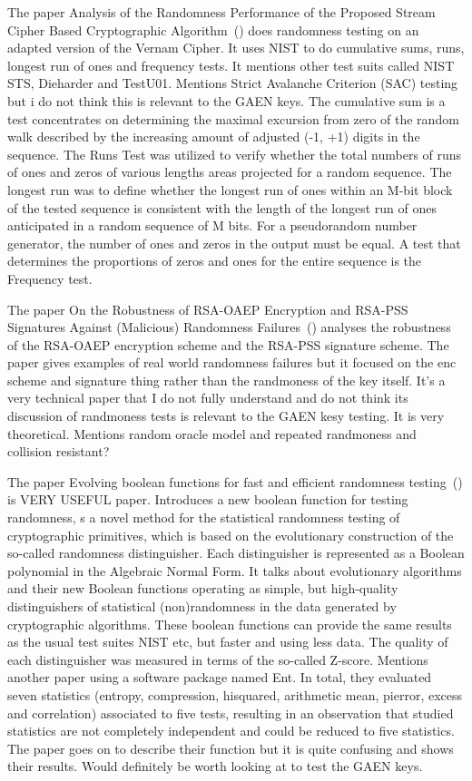 The paper Analysis of the Randomness Performance of the Proposed Stream Cipher Based Cryptographic Algorithm~(\cite{9232553}) does randomness testing on an adapted version of the Vernam Cipher. It uses NIST to do cumulative sums, runs, longest run of ones and frequency tests. It mentions other test suits called NIST STS, Dieharder and TestU01. Mentions Strict Avalanche Criterion (SAC) testing but i do not think this is relevant to the GAEN keys. The cumulative sum is a test concentrates on determining the maximal excursion from zero of the random walk described by the increasing amount of adjusted (-1, +1) digits in the sequence. The Runs Test was utilized to verify whether the total numbers of runs of ones and zeros of various lengths areas projected for a random sequence. The longest run was to define whether the longest run of ones within an M-bit block of the tested sequence is consistent with the length of the longest run of ones anticipated in a random sequence of M bits. For a pseudorandom number generator, the number of ones and zeros in the output must be equal. A test that determines the proportions of zeros and ones for the entire sequence is the Frequency test.

The paper On the Robustness of RSA-OAEP Encryption and RSA-PSS Signatures Against (Malicious) Randomness Failures~(\cite{10.1145/3052973.3053040}) analyses the robustness of the RSA-OAEP encryption scheme and the RSA-PSS signature scheme. The paper gives examples of real world randomness failures but it focused on the enc scheme and signature thing rather than the randmoness of the key itself. It's a very technical paper that I do not fully understand and do not think its discussion of randmoness tests is relevant to the GAEN kesy testing. It is very theoretical. Mentions random oracle model and repeated randmoness and collision resistant? 

The paper Evolving boolean functions for fast and efficient randomness testing~(\cite{10.1145/3205455.3205518}) is VERY USEFUL paper. Introduces a new boolean function for testing randomness, s a novel method for the statistical randomness testing of cryptographic primitives, which is based on the evolutionary construction of the so-called randomness distinguisher. Each distinguisher is represented as a Boolean polynomial in the Algebraic Normal Form. It talks about evolutionary algorithms and their new Boolean functions operating as simple, but high-quality distinguishers of statistical (non)randomness in the data generated by cryptographic algorithms. These boolean functions can provide the same results as the usual test suites NIST etc, but faster and using less data.  The quality of each distinguisher was measured in terms of the so-called Z-score. Mentions another paper using a software package named Ent. In total, they evaluated seven statistics (entropy, compression, hisquared, arithmetic mean, pierror, excess and correlation) associated to five tests, resulting in an observation that studied statistics are not completely independent and could be reduced to five statistics. The paper goes on to describe their function but it is quite confusing and shows their results. Would definitely be worth looking at to test the GAEN keys.

